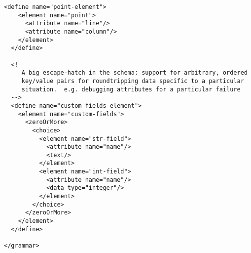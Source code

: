 \begin{lstlisting}[frame=none]
  <define name="point-element">
    <element name="point">
      <attribute name="line"/>
      <attribute name="column"/>
    </element>
  </define>

  <!--
     A big escape-hatch in the schema: support for arbitrary, ordered
     key/value pairs for roundtripping data specific to a particular
     situation.  e.g. debugging attributes for a particular failure
  -->
  <define name="custom-fields-element">
    <element name="custom-fields">
      <zeroOrMore>
        <choice>
          <element name="str-field">
            <attribute name="name"/>
            <text/>
          </element>
          <element name="int-field">
            <attribute name="name"/>
            <data type="integer"/>
          </element>
        </choice>
      </zeroOrMore>
    </element>
  </define>

</grammar>
\end{lstlisting}
